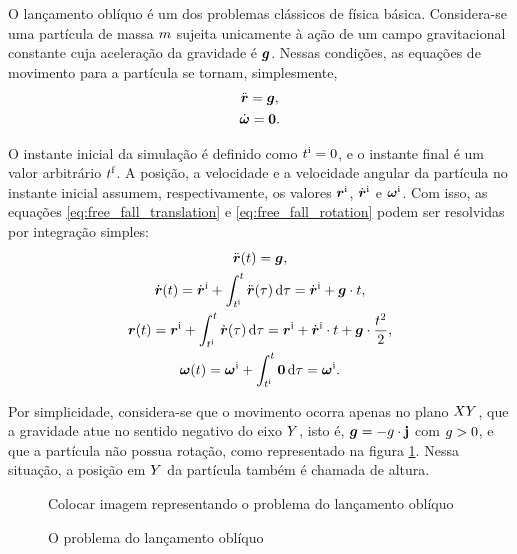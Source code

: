 O lançamento oblíquo é um dos problemas clássicos de física básica. Considera-se uma partícula de massa \(m\) sujeita unicamente à ação de um campo gravitacional constante cuja aceleração da gravidade é \(\bm{g}\). Nessas condições, as equações de movimento para a partícula se tornam, simplesmente,
\begin{gather}
	\acceleration = \gravity, \label{eq:free_fall_translation}\\
	\angularAcceleration = \nullVector \label{eq:free_fall_rotation}.
\end{gather}

O instante inicial da simulação é definido como \(t^{\text{i}}=0\), e o instante final é um valor arbitrário \(t^{\text{f}}\). A posição, a velocidade e a velocidade angular da partícula no instante inicial assumem, respectivamente, os valores \(\bm{r}^{\text{i}}\), \(\initial{\velocity}\) e \(\bm{\omega}^{\text{i}}\). Com isso, as equações \eqref{eq:free_fall_translation} e \eqref{eq:free_fall_rotation} podem ser resolvidas por integração simples:
\begin{gather*}
	\acceleration\pqty{t} = \gravity, \\
	\velocity\pqty{t} = \initial{\velocity} + \int_{\initial{t}}^{t} \acceleration\pqty{\tau} \dd{\tau} = \initial{\velocity} + \gravity\cdot t, \\
	\position\pqty{t} = \initial{\position} + \int_{\initial{t}}^{t} \velocity\pqty{\tau} \dd{\tau} = \initial{\position} + \initial{\velocity}\cdot t + \gravity\cdot \dfrac{t^2}{2}, \\
	\angularVelocity\pqty{t} = \initial{\angularVelocity} + \int_{\initial{t}}^{t} \nullVector \dd{\tau} = \initial{\angularVelocity}.
\end{gather*}

Por simplicidade, considera-se que o movimento ocorra apenas no plano \(XY\), que a gravidade atue no sentido negativo do eixo \(Y\), isto é, \(\bm{g} = -g\cdot\mathbf{j}\) com \(g>0\), e que a partícula não possua rotação, como representado na figura \ref{fig:free_fall}. Nessa situação, a posição em \(Y\) da partícula também é chamada de altura.

\begin{figure}[h]
	\caption{O problema do lançamento oblíquo}
	\begin{center}
		\alert{Colocar imagem representando o problema do lançamento oblíquo}
	\end{center}
	\label{fig:free_fall}
\end{figure}

